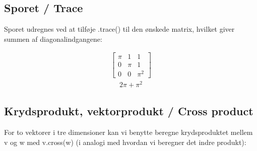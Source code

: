 \documentclass[letterpaper,10pt,english]{jupyterBook}
\begin{document}
\subsection{Sporet / Trace}
\label{\detokenize{notebooks/sympy/Notebook_LinAlg_2:sporet-trace}}
Sporet udregnes ved at tilføje .trace() til den ønskede matrix, hvilket giver summen af diagonalindgangene:

\begin{sphinxVerbatim}[commandchars=\\\{\}]
  \PYG{p}{[}\PYG{p}{[}  \PYG{p}{]}\PYG{p}{[}  \PYG{p}{]}\PYG{p}{[}  \PYG{p}{]}\PYG{p}{]}
\end{sphinxVerbatim}
\begin{equation*}
\begin{split}\displaystyle \left[\begin{matrix}\pi & 1 & 1\\0 & \pi & 1\\0 & 0 & \pi^{2}\end{matrix}\right]\end{split}
\end{equation*}\begin{equation*}
\begin{split}\displaystyle 2 \pi + \pi^{2}\end{split}
\end{equation*}

\subsection{Krydsprodukt, vektorprodukt / Cross product}
\label{\detokenize{notebooks/sympy/Notebook_LinAlg_2:krydsprodukt-vektorprodukt-cross-product}}
For to vektorer i tre dimensioner kan vi benytte beregne krydsproduktet mellem v og w med v.cross(w) (i analogi med hvordan vi beregner det indre produkt):
\end{document}
